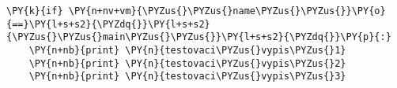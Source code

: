 \begin{Verbatim}[commandchars=\\\{\}]
\PY{k}{if} \PY{n+nv+vm}{\PYZus{}\PYZus{}name\PYZus{}\PYZus{}}\PY{o}{==}\PY{l+s+s2}{\PYZdq{}}\PY{l+s+s2}{\PYZus{}\PYZus{}main\PYZus{}\PYZus{}}\PY{l+s+s2}{\PYZdq{}}\PY{p}{:}
    \PY{n+nb}{print} \PY{n}{testovaci\PYZus{}vypis\PYZus{}1}
    \PY{n+nb}{print} \PY{n}{testovaci\PYZus{}vypis\PYZus{}2}
    \PY{n+nb}{print} \PY{n}{testovaci\PYZus{}vypis\PYZus{}3}
\end{Verbatim}
